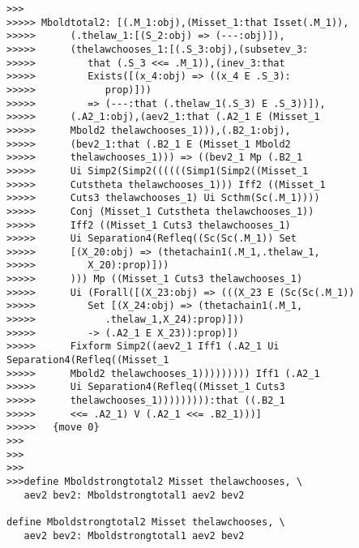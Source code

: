 \documentclass[12pt]{article}
\begin{document}
\begin{verbatim}
>>>
>>>>> Mboldtotal2: [(.M_1:obj),(Misset_1:that Isset(.M_1)),
>>>>>      (.thelaw_1:[(S_2:obj) => (---:obj)]),
>>>>>      (thelawchooses_1:[(.S_3:obj),(subsetev_3:
>>>>>         that (.S_3 <<= .M_1)),(inev_3:that
>>>>>         Exists([(x_4:obj) => ((x_4 E .S_3):
>>>>>            prop)]))
>>>>>         => (---:that (.thelaw_1(.S_3) E .S_3))]),
>>>>>      (.A2_1:obj),(aev2_1:that (.A2_1 E (Misset_1
>>>>>      Mbold2 thelawchooses_1))),(.B2_1:obj),
>>>>>      (bev2_1:that (.B2_1 E (Misset_1 Mbold2
>>>>>      thelawchooses_1))) => ((bev2_1 Mp (.B2_1
>>>>>      Ui Simp2(Simp2((((((Simp1(Simp2((Misset_1
>>>>>      Cutstheta thelawchooses_1))) Iff2 ((Misset_1
>>>>>      Cuts3 thelawchooses_1) Ui Scthm(Sc(.M_1))))
>>>>>      Conj (Misset_1 Cutstheta thelawchooses_1))
>>>>>      Iff2 ((Misset_1 Cuts3 thelawchooses_1)
>>>>>      Ui Separation4(Refleq((Sc(Sc(.M_1)) Set
>>>>>      [(X_20:obj) => (thetachain1(.M_1,.thelaw_1,
>>>>>         X_20):prop)]))
>>>>>      ))) Mp ((Misset_1 Cuts3 thelawchooses_1)
>>>>>      Ui (Forall([(X_23:obj) => (((X_23 E (Sc(Sc(.M_1))
>>>>>         Set [(X_24:obj) => (thetachain1(.M_1,
>>>>>            .thelaw_1,X_24):prop)]))
>>>>>         -> (.A2_1 E X_23)):prop)])
>>>>>      Fixform Simp2((aev2_1 Iff1 (.A2_1 Ui Separation4(Refleq((Misset_1
>>>>>      Mbold2 thelawchooses_1))))))))) Iff1 (.A2_1
>>>>>      Ui Separation4(Refleq((Misset_1 Cuts3
>>>>>      thelawchooses_1))))))))):that ((.B2_1
>>>>>      <<= .A2_1) V (.A2_1 <<= .B2_1)))]
>>>>>   {move 0}
>>>
>>>
>>>
>>>define Mboldstrongtotal2 Misset thelawchooses, \
   aev2 bev2: Mboldstrongtotal1 aev2 bev2

define Mboldstrongtotal2 Misset thelawchooses, \
   aev2 bev2: Mboldstrongtotal1 aev2 bev2


\end{verbatim}
\end{document}
